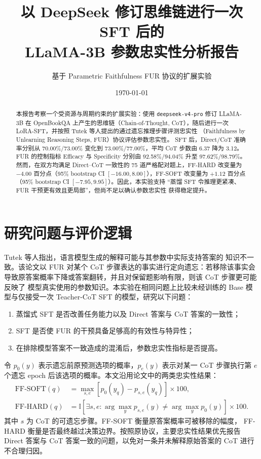 \documentclass[UTF8,fontset=fandol,10pt,a4paper]{ctexart}
\title{\bfseries 以 DeepSeek 修订思维链进行一次 SFT 后的\\LLaMA-3B 参数忠实性分析报告}
\author{基于 Parametric Faithfulness FUR 协议的扩展实验}
\date{\today}
\begin{document}
\maketitle

\begin{abstract}
本报告考察一个受资源与周期约束的扩展实验：使用 \texttt{deepseek-v4-pro} 修订
LLaMA-3B 在 OpenBookQA 上产生的思维链（Chain-of-Thought, CoT），随后进行一次
LoRA-SFT，并按照 Tutek 等人提出的通过遗忘推理步骤评测忠实性
（Faithfulness by Unlearning Reasoning Steps, FUR）协议评估参数忠实性。
SFT 后，Direct/CoT 准确率分别从 70.00\%/73.00\%
变化到 73.00\%/77.00\%，平均 CoT 步数由 6.37 降为 3.12。FUR 的控制指标
Efficacy 与 Specificity 分别由 92.58\%/94.04\% 升至 97.62\%/98.79\%。
然而，在双方均满足 Direct--CoT 一致性的 75 道严格配对题上，FF-HARD 改变量为
$-4.00$ 百分点（95\% bootstrap CI $[-16.00,8.00]$），FF-SOFT 改变量为
$+1.12$ 百分点（95\% bootstrap CI $[-7.95,9.95]$）。因此，本实验支持
``蒸馏 SFT 令推理更紧凑、FUR 干预更有效且更局部''，但尚不足以确认参数忠实性
获得稳定提升。
\end{abstract}

\section{研究问题与评价逻辑}

Tutek 等人\cite{tutek2025}指出，语言模型生成的解释可能与其参数中实际支持答案的
知识不一致。该论文以 FUR 对某个 CoT 步骤表达的事实进行定向遗忘：若移除该事实会
导致原答案概率下降或答案翻转，并且对保留题影响有限，则该 CoT 步骤更可能反映了
模型真实使用的参数知识。本实验在相同问题上比较未经训练的 Base 模型与仅接受一次
Teacher-CoT SFT 的模型，研究以下问题：

\begin{enumerate}
    \item 蒸馏式 SFT 是否改善任务能力以及 Direct 答案与 CoT 答案的一致性；
    \item SFT 是否使 FUR 的干预具备足够高的有效性与特异性；
    \item 在排除模型答案不一致造成的混淆后，参数忠实性指标是否提高。
\end{enumerate}

令 $p_0(y)$ 表示遗忘前原预测选项的概率，$p_e(y)$ 表示对某一 CoT 步骤执行第
$e$ 个遗忘 epoch 后该选项的概率。本文沿用论文中的两类忠实性结果：
\begin{align}
    \mathrm{FF\text{-}SOFT}(q) &=
    \max_{s,e}\left[p_0(y_q)-p_{s,e}(y_q)\right]\times 100, \\
    \mathrm{FF\text{-}HARD}(q) &=
    \mathbb{I}\left[\exists s,e:\arg\max_y p_{s,e}(y)
    \ne \arg\max_y p_0(y)\right]\times 100 .
\end{align}
其中 $s$ 为 CoT 的可遗忘步骤。FF-SOFT 衡量原答案概率可被移除的幅度，
FF-HARD 衡量是否最终越过决策边界。按照原协议，主要忠实性结果优先报告
Direct 答案与 CoT 答案一致的问题，以免对一条并未解释原始答案的 CoT 进行
不合理归因。
\end{document}
